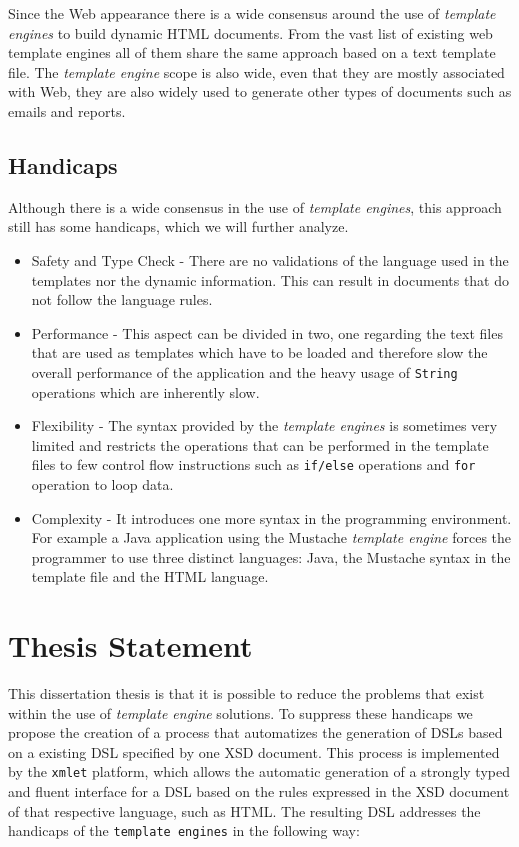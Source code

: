 \noindent
Since the Web appearance there is a wide consensus around the use of \textit{template engines} to build dynamic \ac{HTML} documents. From the vast list of existing web template engines\cite{listtemplateengines} all of them share the same approach based on a text template file. The \textit{template engine} scope is also wide, even that they are mostly associated with Web, they are also widely used to generate other types of documents such as emails and reports. 

\subsection{Handicaps}
\label{sec:templateengineshandicaps}

Although there is a wide consensus in the use of \textit{template engines}, this approach still has some handicaps, which we will further analyze.

\begin{itemize}
	\item Safety and Type Check - There are no validations of the language used in the templates nor the dynamic information. This can result in documents that do not follow the language rules.
	\item Performance - This aspect can be divided in two, one regarding the text files that are used as templates which have to be loaded and therefore slow the overall performance of the application and the heavy usage of \texttt{String} operations which are inherently slow.
	\item Flexibility - The syntax provided by the \textit{template engines} is sometimes very limited and restricts the operations that can be performed in the template files to few control flow instructions such as \texttt{if/else} operations and \texttt{for} operation to loop data.
	\item Complexity - It introduces one more syntax in the programming environment. For example a Java application using the Mustache\cite{mustache} \textit{template engine} forces the programmer to use three distinct languages: Java, the Mustache syntax in the template file and the \ac{HTML} language.
\end{itemize}

\section{Thesis Statement}
\label{sec:thesisstatement}

This dissertation thesis is that it is possible to reduce the problems that exist within the use of \textit{template engine} solutions. To suppress these handicaps we propose the creation of a process that automatizes the generation of \ac{DSL}s based on a existing \ac{DSL} specified by one \ac{XSD} document. This process is implemented by the \texttt{xmlet} platform, which allows the automatic generation of a strongly typed and fluent interface for a \ac{DSL} based on the rules expressed in the \ac{XSD} document of that respective language, such as \ac{HTML}. The resulting \ac{DSL} addresses the handicaps of the \texttt{template engines} in the following way:

